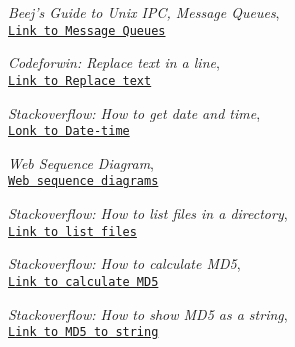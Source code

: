 \documentclass[12pt,a4paper]{article}
\begin{document}
\begin{thebibliography}{9}
\emph{Beej's Guide to Unix IPC, Message Queues},
\\\texttt{\href{https://beej.us/guide/bgipc/html/multi/mq.html}{Link to Message Queues}}


\emph{Codeforwin: Replace text in a line},
\\\texttt{\href{https://codeforwin.org/2018/02/c-program-replace-specific-line-a-text-file.html}
{Link to Replace text}}


\emph{Stackoverflow: How to get date and time},
\\\texttt{\href{https://stackoverflow.com/questions/1442116/how-to-get-the-date-and-time-values-in-a-c-program}
{Lonk to Date-time}}

\emph{Web Sequence Diagram},
\\\texttt{\href{https://www.websequencediagrams.com/}{Web sequence diagrams}}

\emph{Stackoverflow: How to list files in a directory},
\\\texttt{\href{https://stackoverflow.com/questions/4204666/how-to-list-files-in-a-directory-in-a-c-program}{Link to list files}}

\emph{Stackoverflow: How to calculate MD5},
\\\texttt{\href{https://stackoverflow.com/questions/10324611/how-to-calculate-the-md5-hash-of-a-large-file-in-c}{Link to calculate MD5}}

\emph{Stackoverflow: How to show MD5 as a string},
\\\texttt{\href{https://stackoverflow.com/questions/7627723/how-to-create-a-md5-hash-of-a-string-in-c}{Link to MD5 to string}}
\end{thebibliography}
\end{document}
